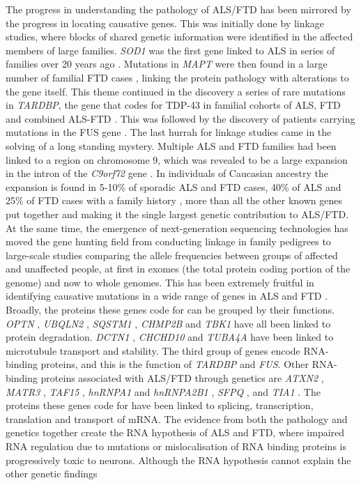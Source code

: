 The progress in understanding the pathology of ALS/FTD has been mirrored by the progress in locating causative genes. 
This was initially done by linkage studies, where blocks of shared genetic information were identified in the affected members of large families. 
\textit{SOD1} was the first gene linked to ALS in series of families over 20 years ago \citep{Rosen1993}. 
Mutations in \textit{MAPT} were then found in a large number of familial FTD cases \citep{Hutton1998}, linking the protein pathology with alterations to the gene itself. 
This theme continued in the discovery a series of rare mutations in \textit{TARDBP}, the gene that codes for TDP-43 in familial cohorts of ALS, FTD and combined ALS-FTD \citep{Sreedharan2008-xv, Kabashi2008, Benajiba2009,Borroni2009}. 
This was followed by the discovery of patients carrying mutations in the FUS gene \citep{Vance2009-ye}. 
The last hurrah for linkage studies came in the solving of a long standing mystery. 
Multiple ALS and FTD families had been linked to a region on chromosome 9, which was revealed to be a large expansion in the intron of the \textit{C9orf72} gene \citep{Renton2011,DeJesus-Hernandez2011}. 
In individuals of Caucasian ancestry the expansion is found in 5-10\% of sporadic ALS and FTD cases, 40\% of ALS and 25\% of FTD cases with a family history \citep{Majounie2012}, more than all the other known genes put together and making it the single largest genetic contribution to ALS/FTD. 
At the same time, the emergence of next-generation sequencing technologies has moved the gene hunting field from conducting linkage in family pedigrees to large-scale studies comparing the allele frequencies between groups of affected and unaffected people, at first in exomes (the total protein coding portion of the genome) and now to whole genomes. 
This has been extremely fruitful in identifying causative mutations in a wide range of genes in ALS and FTD \citep{Taylor2016,Pottier2016}. 
Broadly, the proteins these genes code for can be grouped by their functions. 
\textit{OPTN} \citep{Maruyama2010} , \textit{UBQLN2} \citep{Deng2011}, \textit{SQSTM1} \citep{Fecto2011}, \textit{CHMP2B} \citep{Skibinski2005} and \textit{TBK1} \citep{Cirulli2015,Freischmidt2015} have all been linked to protein degradation. 
\textit{DCTN1} \citep{Puls2003} , \textit{CHCHD10} \citep{Bannwarth2014} and \textit{TUBA4A} \citep{Smith2014} have been linked to microtubule transport and stability. 
The third group of genes encode RNA-binding proteins, and this is the function of \textit{TARDBP} and \textit{FUS}. 
Other RNA-binding proteins associated with ALS/FTD through genetics are \textit{ATXN2} \citep{Elden2010}, \textit{MATR3} \citep{Johnson2014}, \textit{TAF15}  \citep{Ticozzi2011}, \textit{hnRNPA1} and \textit{hnRNPA2B1} \citep{Kim2013}, \textit{SFPQ} \citep{Thomas-Jinu2017}, and \textit{TIA1} \citep{Mackenzie2017}. 
The proteins these genes code for have been linked to splicing, transcription, translation and transport of mRNA. 
The evidence from both the pathology and genetics together create the RNA hypothesis of ALS and FTD, where impaired RNA regulation due to mutations or mislocalisation of RNA binding proteins is progressively toxic to neurons.
Although the RNA hypothesis cannot explain the other genetic findings
